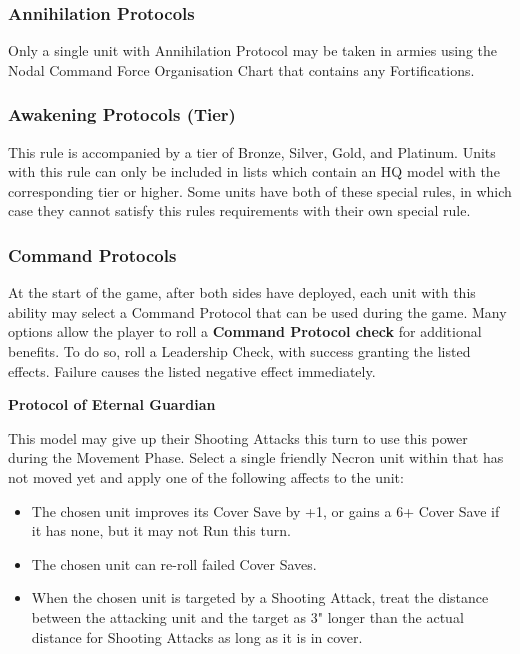 

\begin{multicols}{2}

\subsubsection{Annihilation Protocols} \label{Annihilation Protocols}

Only a single unit with Annihilation Protocol may be taken in armies using the Nodal Command Force Organisation Chart that contains any Fortifications.

\subsubsection{Awakening Protocols (Tier)} \label{Awakening Protocols}

This rule is accompanied by a tier of Bronze, Silver, Gold, and Platinum. Units with this rule can only be included in lists which contain an HQ model with the corresponding  tier or higher. Some units have both of these special rules, in which case they cannot satisfy this rules requirements with their own  special rule.

\subsubsection{Command Protocols} \label{Command Protocols}

At the start of the game, after both sides have deployed, each unit with this ability may select a Command Protocol that can be used during the game. Many options allow the player to roll a \textbf{Command Protocol check} for additional benefits. To do so, roll a Leadership Check, with success granting the listed effects. Failure causes the listed negative effect immediately.

\textbf{Protocol of Eternal Guardian}

This model may give up their Shooting Attacks this turn to use this power during the Movement Phase. Select a single friendly Necron unit within  that has not moved yet and apply one of the following affects to the unit:

\begin{itemize}
	\itemsep 0pt
	\item The chosen unit improves its Cover Save by +1, or gains a 6+ Cover Save if it has none, but it may not Run this turn.
	\item The chosen unit can re-roll failed Cover Saves.
	\item When the chosen unit is targeted by a Shooting Attack, treat the distance between the attacking unit and the target as 3" longer than the actual distance for Shooting Attacks as long as it is in cover.
\end{itemize}


\end{multicols}
